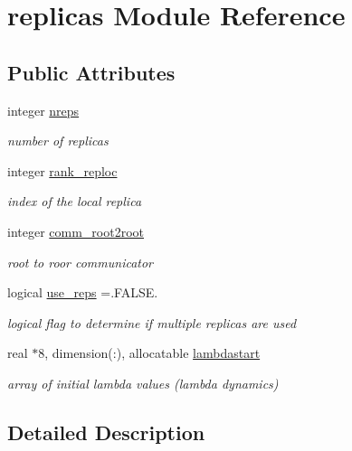 \hypertarget{classreplicas}{\section{replicas Module Reference}
\label{classreplicas}
}
\subsection*{Public Attributes}
\begin{DoxyCompactItemize}
\item 
integer \hyperlink{classreplicas_af0425acb44a782da3a96d7028c4372fa}{nreps}
\begin{DoxyCompactList}\small\item\em number of replicas \end{DoxyCompactList}\item 
integer \hyperlink{classreplicas_ae968ad9408fdb3603acb8070a164aa7a}{rank\-\_\-reploc}
\begin{DoxyCompactList}\small\item\em index of the local replica \end{DoxyCompactList}\item 
integer \hyperlink{classreplicas_addae477c642cce272217efe213b8b095}{comm\-\_\-root2root}
\begin{DoxyCompactList}\small\item\em root to roor communicator \end{DoxyCompactList}\item 
logical \hyperlink{classreplicas_ad61522409fd682821e32815718631e59}{use\-\_\-reps} =.F\-A\-L\-S\-E.
\begin{DoxyCompactList}\small\item\em logical flag to determine if multiple replicas are used \end{DoxyCompactList}\item 
real $\ast$8, dimension(\-:), allocatable \hyperlink{classreplicas_a824fbac4f1cb495207fdd32901803fb0}{lambdastart}
\begin{DoxyCompactList}\small\item\em array of initial lambda values (lambda dynamics) \end{DoxyCompactList}\end{DoxyCompactItemize}


\subsection{Detailed Description}


